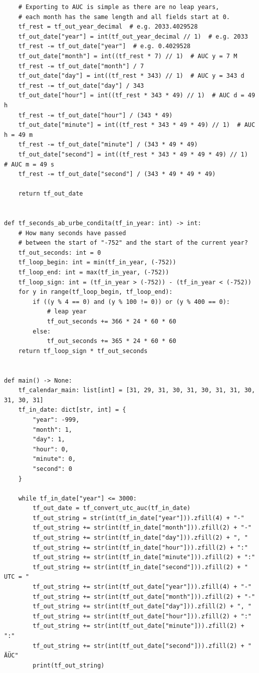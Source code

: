 \begin{tiny}
\begin{ttfamily}
\begin{verbatim}
    # Exporting to AUC is simple as there are no leap years,
    # each month has the same length and all fields start at 0.
    tf_rest = tf_out_year_decimal  # e.g. 2033.4029528
    tf_out_date["year"] = int(tf_out_year_decimal // 1)  # e.g. 2033
    tf_rest -= tf_out_date["year"]  # e.g. 0.4029528
    tf_out_date["month"] = int((tf_rest * 7) // 1)  # AUC y = 7 M
    tf_rest -= tf_out_date["month"] / 7
    tf_out_date["day"] = int((tf_rest * 343) // 1)  # AUC y = 343 d
    tf_rest -= tf_out_date["day"] / 343
    tf_out_date["hour"] = int((tf_rest * 343 * 49) // 1)  # AUC d = 49 h
    tf_rest -= tf_out_date["hour"] / (343 * 49)
    tf_out_date["minute"] = int((tf_rest * 343 * 49 * 49) // 1)  # AUC h = 49 m
    tf_rest -= tf_out_date["minute"] / (343 * 49 * 49)
    tf_out_date["second"] = int((tf_rest * 343 * 49 * 49 * 49) // 1)  # AUC m = 49 s
    tf_rest -= tf_out_date["second"] / (343 * 49 * 49 * 49)

    return tf_out_date


def tf_seconds_ab_urbe_condita(tf_in_year: int) -> int:
    # How many seconds have passed
    # between the start of "-752" and the start of the current year?
    tf_out_seconds: int = 0
    tf_loop_begin: int = min(tf_in_year, (-752))
    tf_loop_end: int = max(tf_in_year, (-752))
    tf_loop_sign: int = (tf_in_year > (-752)) - (tf_in_year < (-752))
    for y in range(tf_loop_begin, tf_loop_end):
        if ((y % 4 == 0) and (y % 100 != 0)) or (y % 400 == 0):
            # leap year
            tf_out_seconds += 366 * 24 * 60 * 60
        else:
            tf_out_seconds += 365 * 24 * 60 * 60
    return tf_loop_sign * tf_out_seconds


def main() -> None:
    tf_calendar_main: list[int] = [31, 29, 31, 30, 31, 30, 31, 31, 30, 31, 30, 31]
    tf_in_date: dict[str, int] = {
        "year": -999,
        "month": 1,
        "day": 1,
        "hour": 0,
        "minute": 0,
        "second": 0
    }

    while tf_in_date["year"] <= 3000:
        tf_out_date = tf_convert_utc_auc(tf_in_date)
        tf_out_string = str(int(tf_in_date["year"])).zfill(4) + "-"
        tf_out_string += str(int(tf_in_date["month"])).zfill(2) + "-"
        tf_out_string += str(int(tf_in_date["day"])).zfill(2) + ", "
        tf_out_string += str(int(tf_in_date["hour"])).zfill(2) + ":"
        tf_out_string += str(int(tf_in_date["minute"])).zfill(2) + ":"
        tf_out_string += str(int(tf_in_date["second"])).zfill(2) + " UTC = "
        tf_out_string += str(int(tf_out_date["year"])).zfill(4) + "-"
        tf_out_string += str(int(tf_out_date["month"])).zfill(2) + "-"
        tf_out_string += str(int(tf_out_date["day"])).zfill(2) + ", "
        tf_out_string += str(int(tf_out_date["hour"])).zfill(2) + ":"
        tf_out_string += str(int(tf_out_date["minute"])).zfill(2) + ":"
        tf_out_string += str(int(tf_out_date["second"])).zfill(2) + " ÄÜC"
        print(tf_out_string)


\end{verbatim}
\end{ttfamily}
\end{tiny}

